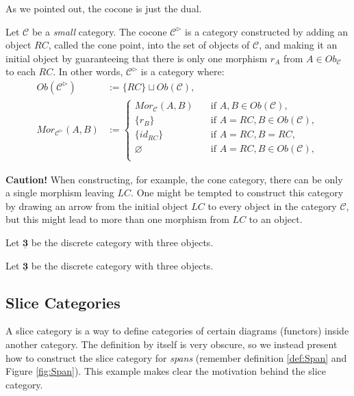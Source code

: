 As we pointed out, the cocone is just the dual.

\begin{definition}
  Let $\mathcal C$ be a \textit{small} category. The cocone $\mathcal C^{\rhd}$ is a category constructed
  by adding an object $RC$, called the cone point, into the set of objects of $\mathcal C$,
  and making it an initial object by guaranteeing that there is only one morphism $r_A$ from $A \in Ob_\mathcal C$ to each
  $RC$. In other words, $\mathcal C^{\rhd}$ is a category where:
  \begin{align*}
    Ob(\mathcal C^{\rhd}) &:= \{RC\} \sqcup Ob(\mathcal C),\\
    Mor_{\mathcal C^{\rhd}}(A,B) &:=
    \begin{cases}
      Mor_\mathcal C (A,B)  \quad &\text{if } A,B \in Ob(\mathcal C), \\
      \{r_B\} \quad &\text{if } A = RC, B \in Ob(\mathcal C),\\
      \{id_{RC}\}  \quad &\text{if } A = RC, B = RC, \\
      \varnothing  \quad &\text{if } A = RC, B \in Ob(\mathcal C), \\
    \end{cases}
  \end{align*}
\end{definition}

\textbf{Caution!} When constructing, for example, the cone category, there can
be only a single morphism leaving $LC$. One might be tempted to construct this
category by drawing an arrow from the initial object $LC$ to every object
in the category $\mathcal C$, but this might lead to more than one morphism
from $LC$ to an object.

\begin{example}
  Let $\mathbf{\underline{3}}$ be the discrete category with three objects.
\end{example}

\begin{example}
  Let $\mathbf{\underline{3}}$ be the discrete category with three objects.
\end{example}


\subsection{Slice Categories}

A slice category is a way to define categories of certain diagrams (functors) inside another category.
The definition by itself is very obscure, so we instead present how to construct the slice
category for \textit{spans} (remember definition \ref{def:Span} and Figure \ref{fig:Span}).
This example makes clear the motivation behind the slice category.

